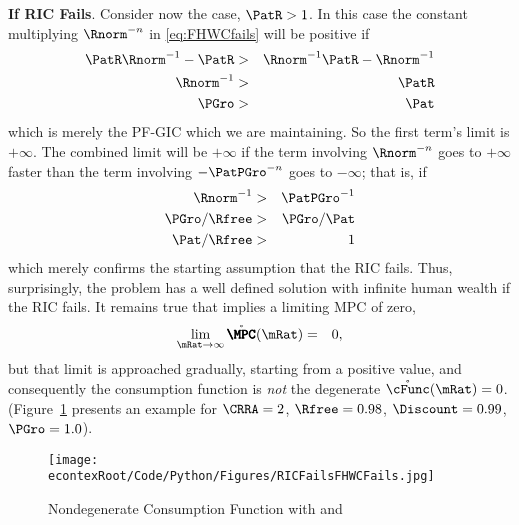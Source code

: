 \documentclass[../BufferStockTheory.tex]{subfiles}
\begin{document}
{\bf If RIC Fails}.  Consider now the  case, $\PatR > 1$.  In this case the constant multiplying
$\Rnorm^{-n}$ in \eqref{eq:FHWCfails} will be positive if
\begin{eqnarray*}
  \PatR \Rnorm^{-1} - \PatR & > &  \Rnorm^{-1}\PatR-\Rnorm^{-1}
\\ \Rnorm^{-1} & > & \PatR
\\ \PGro & > & \Pat
\end{eqnarray*}
which is merely the PF-GIC which we are maintaining.  So the first term's limit is $+\infty$.  The
combined limit will be $+\infty$ if the term involving $\Rnorm^{-n}$
goes to $+\infty$ faster than the term involving $-\PatPGro^{-n}$ goes to
$-\infty$; that is, if
\begin{eqnarray*}
  \Rnorm^{-1} & > & \PatPGro^{-1}
\\ \PGro/\Rfree & > & \PGro/\Pat
\\ \Pat/\Rfree & > & 1
\end{eqnarray*}
which merely confirms the starting assumption that the RIC fails.
Thus, surprisingly, the problem has a well defined solution with
infinite human wealth if the RIC fails.  It remains true that 
implies a limiting MPC of zero,
\begin{eqnarray}
  \lim_{\mRat \rightarrow \infty} \mathring{\pmb{\MPC}}(\mRat)  & = & 0,
\end{eqnarray}
but that limit is approached gradually, starting from a positive
value, and consequently the consumption function is {\it not} the
degenerate $\mathring{\cFunc}(\mRat)=0$.  (Figure~\ref{fig:PFGICHoldsFHWCFailsRICFails} presents an example for $\CRRA=2$, $\Rfree=0.98$, $\Discount = 0.99$, $\PGro = 1.0$).

\begin{figure}
\centerline{\texttt{[image: \\econtexRoot/Code/Python/Figures/RICFailsFHWCFails.jpg]}}
\caption{Nondegenerate Consumption Function with  and }
\label{fig:PFGICHoldsFHWCFailsRICFails}
\end{figure}
\end{document}
